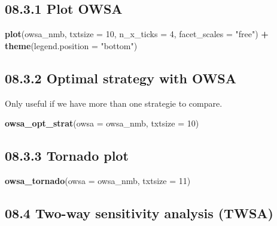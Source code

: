\documentclass[]{article}
\newenvironment{Shaded}{\begin{snugshade}}{\end{snugshade}}
\newcommand{\KeywordTok}[1]{\textcolor[rgb]{0.13,0.29,0.53}{\textbf{#1}}}
\newcommand{\DataTypeTok}[1]{\textcolor[rgb]{0.13,0.29,0.53}{#1}}
\newcommand{\DecValTok}[1]{\textcolor[rgb]{0.00,0.00,0.81}{#1}}
\newcommand{\StringTok}[1]{\textcolor[rgb]{0.31,0.60,0.02}{#1}}
\newcommand{\OperatorTok}[1]{\textcolor[rgb]{0.81,0.36,0.00}{\textbf{#1}}}
\newcommand{\NormalTok}[1]{#1}
\begin{document}
\subsection{08.3.1 Plot OWSA}\label{plot-owsa}

\begin{Shaded}
\begin{Highlighting}[]
\KeywordTok{plot}\NormalTok{(owsa_nmb, }\DataTypeTok{txtsize =} \DecValTok{10}\NormalTok{, }\DataTypeTok{n_x_ticks =} \DecValTok{4}\NormalTok{, }
     \DataTypeTok{facet_scales =} \StringTok{"free"}\NormalTok{) }\OperatorTok{+}
\StringTok{     }\KeywordTok{theme}\NormalTok{(}\DataTypeTok{legend.position =} \StringTok{"bottom"}\NormalTok{)}
\end{Highlighting}
\end{Shaded}

\subsection{08.3.2 Optimal strategy with
OWSA}\label{optimal-strategy-with-owsa}

Only useful if we have more than one strategie to compare.

\begin{Shaded}
\begin{Highlighting}[]
\KeywordTok{owsa_opt_strat}\NormalTok{(}\DataTypeTok{owsa =}\NormalTok{ owsa_nmb, }\DataTypeTok{txtsize =} \DecValTok{10}\NormalTok{)}
\end{Highlighting}
\end{Shaded}

\subsection{08.3.3 Tornado plot}\label{tornado-plot}

\begin{Shaded}
\begin{Highlighting}[]
\KeywordTok{owsa_tornado}\NormalTok{(}\DataTypeTok{owsa =}\NormalTok{ owsa_nmb, }\DataTypeTok{txtsize =} \DecValTok{11}\NormalTok{)}
\end{Highlighting}
\end{Shaded}

\subsection{08.4 Two-way sensitivity analysis
(TWSA)}\label{two-way-sensitivity-analysis-twsa}
\end{document}
